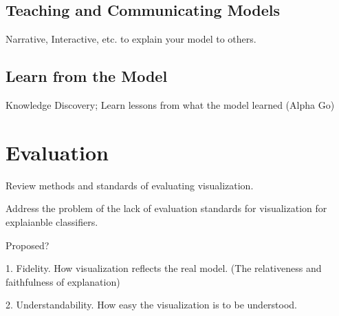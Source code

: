 \subsection{Teaching and Communicating Models}
Narrative, Interactive, etc. to explain your model to others.
\subsection{Learn from the Model} 
Knowledge Discovery; Learn lessons from what the model learned (Alpha Go)

\section{Evaluation}

Review methods and standards of evaluating visualization.

Address the problem of the lack of evaluation standards for visualization for explaianble classifiers.

Proposed?

1. Fidelity. How visualization reflects the real model. (The relativeness and faithfulness of explanation)

2. Understandability. How easy the visualization is to be understood.

\newpage

